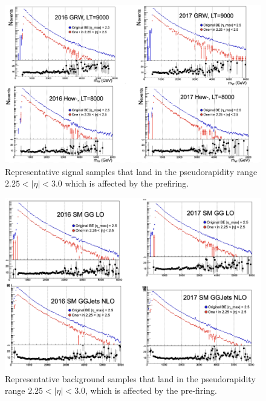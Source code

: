 \begin{figure}[!htb]
	\centering
	\includegraphics[scale=0.6]{fig/EEL1Prefiring2.png}
	\caption{Representative signal samples that land in the pseudorapidity range $2.25 < |\eta| <3.0$ which is affected by the prefiring.}
	\label{fig:EEL1Prefiringcheck2}
\end{figure}


\begin{figure}[!htb]
    \centering
    \includegraphics[scale=0.6]{fig/EEL1Prefiring1.png}
    \caption{Representative background samples that land in the pseudorapidity range $2.25 < |\eta| < 3.0$, which is affected by the pre-firing.}
    \label{fig:EEL1Prefiringcheck1}
\end{figure}



